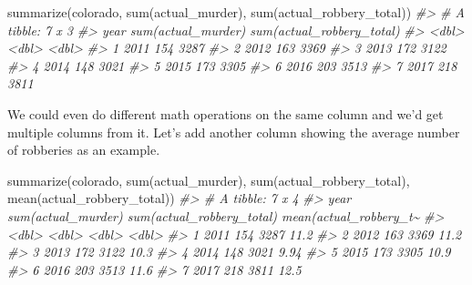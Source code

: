 \documentclass[
]{krantz}
\makeatletter
\newenvironment{Shaded}{\begin{snugshade}}{\end{snugshade}}
\newcommand{\CommentTok}[1]{\textcolor[rgb]{0.37,0.37,0.37}{\textit{#1}}}
\newcommand{\FunctionTok}[1]{\textcolor[rgb]{0,0,0}{#1}}
\newcommand{\NormalTok}[1]{#1}
\newenvironment{kframe}{%
\medskip{}
\setlength{\fboxsep}{.8em}
 \def\at@end@of@kframe{}%
 \ifinner\ifhmode%
  \def\at@end@of@kframe{\end{minipage}}%
  \begin{minipage}{\columnwidth}%
 \fi\fi%
 \def\FrameCommand##1{\hskip\@totalleftmargin \hskip-\fboxsep
 \colorbox{shadecolor}{##1}\hskip-\fboxsep
     \hskip-\linewidth \hskip-\@totalleftmargin \hskip\columnwidth}%
 \MakeFramed {\advance\hsize-\width
   \@totalleftmargin\z@ \linewidth\hsize
   \@setminipage}}%
 {\par\unskip\endMakeFramed%
 \at@end@of@kframe}
\renewenvironment{Shaded}{\begin{kframe}}{\end{kframe}}
\makeatother
\begin{document}
\begin{Shaded}
\begin{Highlighting}[]
\FunctionTok{summarize}\NormalTok{(colorado, }\FunctionTok{sum}\NormalTok{(actual\_murder), }
          \FunctionTok{sum}\NormalTok{(actual\_robbery\_total))}
\CommentTok{\#\textgreater{} \# A tibble: 7 x 3}
\CommentTok{\#\textgreater{}    year \textasciigrave{}sum(actual\_murder)\textasciigrave{} \textasciigrave{}sum(actual\_robbery\_total)\textasciigrave{}}
\CommentTok{\#\textgreater{}   \textless{}dbl\textgreater{}                \textless{}dbl\textgreater{}                       \textless{}dbl\textgreater{}}
\CommentTok{\#\textgreater{} 1  2011                  154                        3287}
\CommentTok{\#\textgreater{} 2  2012                  163                        3369}
\CommentTok{\#\textgreater{} 3  2013                  172                        3122}
\CommentTok{\#\textgreater{} 4  2014                  148                        3021}
\CommentTok{\#\textgreater{} 5  2015                  173                        3305}
\CommentTok{\#\textgreater{} 6  2016                  203                        3513}
\CommentTok{\#\textgreater{} 7  2017                  218                        3811}
\end{Highlighting}
\end{Shaded}

We could even do different math operations on the same column and we'd get multiple columns from it. Let's add another column showing the average number of robberies as an example.

\begin{Shaded}
\begin{Highlighting}[]
\FunctionTok{summarize}\NormalTok{(colorado, }\FunctionTok{sum}\NormalTok{(actual\_murder),}
          \FunctionTok{sum}\NormalTok{(actual\_robbery\_total),}
          \FunctionTok{mean}\NormalTok{(actual\_robbery\_total))}
\CommentTok{\#\textgreater{} \# A tibble: 7 x 4}
\CommentTok{\#\textgreater{}    year \textasciigrave{}sum(actual\_murder)\textasciigrave{} \textasciigrave{}sum(actual\_robbery\_total)\textasciigrave{} \textasciigrave{}mean(actual\_robbery\_t\textasciitilde{}}
\CommentTok{\#\textgreater{}   \textless{}dbl\textgreater{}                \textless{}dbl\textgreater{}                       \textless{}dbl\textgreater{}                   \textless{}dbl\textgreater{}}
\CommentTok{\#\textgreater{} 1  2011                  154                        3287                   11.2 }
\CommentTok{\#\textgreater{} 2  2012                  163                        3369                   11.2 }
\CommentTok{\#\textgreater{} 3  2013                  172                        3122                   10.3 }
\CommentTok{\#\textgreater{} 4  2014                  148                        3021                    9.94}
\CommentTok{\#\textgreater{} 5  2015                  173                        3305                   10.9 }
\CommentTok{\#\textgreater{} 6  2016                  203                        3513                   11.6 }
\CommentTok{\#\textgreater{} 7  2017                  218                        3811                   12.5}
\end{Highlighting}
\end{Shaded}
\end{document}
